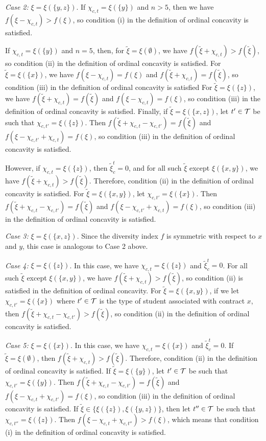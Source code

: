 \documentclass[12pt]{amsart}
\theoremstyle{remark}
\begin{document}
\medskip
\noindent
\emph{Case 2:} $\xi=\xi(\{y,z\})$. If $\chi_{c,t}=\xi(\{y\})$ and $n>5$,
then we have $f(\xi-\chi_{c,t})>f(\xi)$, so condition (i) in the
definition of ordinal concavity is satisfied.

If $\chi_{c,t}=\xi(\{y\})$ and $n=5$, then, for $\tilde \xi = \xi(\emptyset)$, we have
$f(\tilde \xi+\chi_{c,t})>f(\tilde \xi)$, so condition (ii) in the definition
of ordinal concavity is satisfied. For $\tilde \xi = \xi(\{x\})$, we have
$f(\xi-\chi_{c,t})=f(\xi)$ and $f(\tilde \xi+\chi_{c,t})=f(\tilde \xi)$, so
condition (iii) in the definition of ordinal concavity is satisfied
For $\tilde \xi = \xi(\{z\})$, we have
$f(\tilde \xi +\chi_{c,t})=f(\tilde \xi)$ and $f(\xi-\chi_{c,t})=f(\xi)$, so
condition (iii) in the definition of ordinal concavity is satisfied. Finally, if
$\tilde \xi = \xi(\{x,z\})$, let $t'\in \mathcal{T}$ be such that $\chi_{c,t'}=\xi(\{z\})$.
Then $f(\tilde \xi +\chi_{c,t}-\chi_{c,t'})=f(\tilde \xi)$ and
$f(\xi-\chi_{c,t'}+\chi_{c,t})=f(\xi)$, so condition (iii) in the definition of
ordinal concavity is satisfied.

However, if $\chi_{c,t}=\xi(\{z\})$, then $\tilde{\xi}_c^t=0$,
and for all such $\tilde \xi$ except $\xi(\{x,y\})$, we have
$f(\tilde \xi+\chi_{c,t})>f(\tilde{\xi})$. Therefore, condition (ii)  in the definition of ordinal concavity is satisfied. For $\tilde \xi = \xi(\{x,y\})$, let
$\chi_{c,t'} = \xi(\{x\})$. Then $f(\tilde \xi +\chi_{c,t}-\chi_{c,t'})=f(\tilde \xi)$
and $f(\xi-\chi_{c,t'}+\chi_{c,t})=f(\xi)$, so condition (iii) in the
definition of ordinal concavity is satisfied.

\medskip
\noindent
\emph{Case 3:} $\xi=\xi(\{x,z\})$. Since the diversity index $f$ is symmetric
with respect to $x$ and $y$, this case is analogous to Case 2 above.

\medskip
\noindent
\emph{Case 4:} $\xi=\xi(\{z\})$. In this case, we have $\chi_{c,t}=\xi(\{z\})$ and
$\tilde{\xi}_c^t=0$. For all such $\tilde{\xi}$ except $\xi(\{x,y\})$, we have
$f(\tilde{\xi}+\chi_{c,t})>f(\tilde{\xi})$, so condition (ii) is
satisfied in the definition of ordinal concavity. For $\tilde{\xi}=\xi(\{x,y\})$,
if we let $\chi_{c,t'}=\xi(\{x\})$ where $t'\in \mathcal{T}$ is the type of student
associated with contract $x$, then $f(\tilde \xi+\chi_{c,t}-\chi_{c,t'}) >
f(\tilde \xi)$, so condition (ii) in the definition of ordinal concavity is
satisfied.

\medskip
\noindent
\emph{Case 5:} $\xi=\xi(\{x\})$. In this case, we have $\chi_{c,t}=\xi(\{x\})$ and
$\tilde{\xi}_c^t=0$. If $\tilde \xi = \xi(\emptyset)$, then
$f(\tilde \xi+\chi_{c,t})>f(\tilde \xi)$.
Therefore, condition (ii) in the definition of ordinal concavity is satisfied.
If $\tilde \xi = \xi(\{y\})$, let $t'\in \mathcal{T}$ be such that $\chi_{c,t'}=\xi(\{y\})$.
Then $f(\tilde{\xi}+\chi_{c,t}-\chi_{c,t'})=f(\tilde{\xi})$
and $f(\xi-\chi_{c,t}+\chi_{c,t'})=f(\xi)$, so condition (iii) in the definition of
ordinal concavity is satisfied.
If $\tilde{\xi} \in \{\xi(\{z\}),\xi(\{y,z\})\}$, then
let $t''\in \mathcal{T}$ be such that $\chi_{c,t''}=\xi(\{z\})$.
Then $f(\xi-\chi_{c,t}+\chi_{c,t''})>f(\xi)$,
which means that condition (i) in the definition of ordinal
concavity is satisfied.
\end{document}
